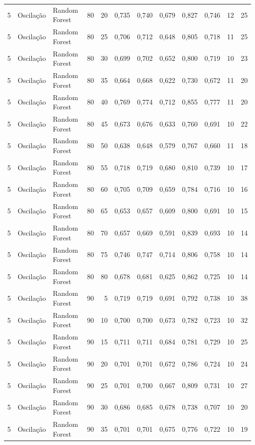 \begin{longtable}{@{}rllrrrrrrrrr@{}}
5 & Oscilação & Random Forest & 80 & 20 & 0,735 & 0,740 & 0,679 & 0,827 & 0,746 & 12 & 25 \\
5 & Oscilação & Random Forest & 80 & 25 & 0,706 & 0,712 & 0,648 & 0,805 & 0,718 & 11 & 25 \\
5 & Oscilação & Random Forest & 80 & 30 & 0,699 & 0,702 & 0,652 & 0,800 & 0,719 & 10 & 23 \\
5 & Oscilação & Random Forest & 80 & 35 & 0,664 & 0,668 & 0,622 & 0,730 & 0,672 & 11 & 20 \\
5 & Oscilação & Random Forest & 80 & 40 & 0,769 & 0,774 & 0,712 & 0,855 & 0,777 & 11 & 20 \\
5 & Oscilação & Random Forest & 80 & 45 & 0,673 & 0,676 & 0,633 & 0,760 & 0,691 & 10 & 22 \\
5 & Oscilação & Random Forest & 80 & 50 & 0,638 & 0,648 & 0,579 & 0,767 & 0,660 & 11 & 18 \\
5 & Oscilação & Random Forest & 80 & 55 & 0,718 & 0,719 & 0,680 & 0,810 & 0,739 & 10 & 17 \\
5 & Oscilação & Random Forest & 80 & 60 & 0,705 & 0,709 & 0,659 & 0,784 & 0,716 & 10 & 16 \\
5 & Oscilação & Random Forest & 80 & 65 & 0,653 & 0,657 & 0,609 & 0,800 & 0,691 & 10 & 15 \\
5 & Oscilação & Random Forest & 80 & 70 & 0,657 & 0,669 & 0,591 & 0,839 & 0,693 & 10 & 14 \\
5 & Oscilação & Random Forest & 80 & 75 & 0,746 & 0,747 & 0,714 & 0,806 & 0,758 & 10 & 14 \\
5 & Oscilação & Random Forest & 80 & 80 & 0,678 & 0,681 & 0,625 & 0,862 & 0,725 & 10 & 14 \\
5 & Oscilação & Random Forest & 90 & 5 & 0,719 & 0,719 & 0,691 & 0,792 & 0,738 & 10 & 38 \\
5 & Oscilação & Random Forest & 90 & 10 & 0,700 & 0,700 & 0,673 & 0,782 & 0,723 & 10 & 32 \\
5 & Oscilação & Random Forest & 90 & 15 & 0,711 & 0,711 & 0,684 & 0,781 & 0,729 & 10 & 25 \\
5 & Oscilação & Random Forest & 90 & 20 & 0,701 & 0,701 & 0,672 & 0,786 & 0,724 & 10 & 24 \\
5 & Oscilação & Random Forest & 90 & 25 & 0,701 & 0,700 & 0,667 & 0,809 & 0,731 & 10 & 27 \\
5 & Oscilação & Random Forest & 90 & 30 & 0,686 & 0,685 & 0,678 & 0,738 & 0,707 & 10 & 20 \\
5 & Oscilação & Random Forest & 90 & 35 & 0,701 & 0,701 & 0,675 & 0,776 & 0,722 & 10 & 19 \\

\end{longtable}
